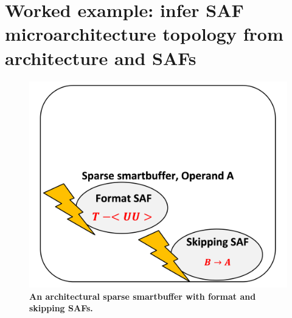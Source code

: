 \chapter{Worked example: infer SAF microarchitecture topology from architecture and SAFs}
\label{appendix:safinfer_build}

\begin{figure}[ht]
\includegraphics[width=\textwidth]{figures/safinfer_build_00saf.png}
\caption{\textbf{An architectural sparse smartbuffer with format and skipping SAFs.}}
\label{fig:safinfer_build_00saf}
\centering
\end{figure}



